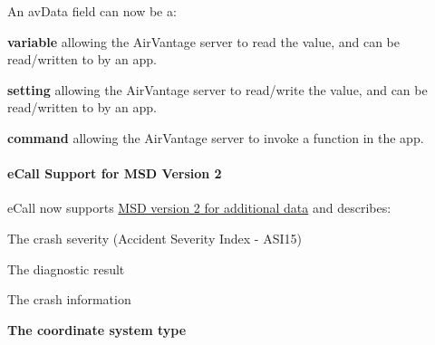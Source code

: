 An av\+Data field can now be a\+:
\begin{DoxyItemize}
\item {\bfseries variable} allowing the Air\+Vantage server to read the value, and can be read/written to by an app.
\item {\bfseries setting} allowing the Air\+Vantage server to read/write the value, and can be read/written to by an app.
\item {\bfseries command} allowing the Air\+Vantage server to invoke a function in the app.
\end{DoxyItemize}\hypertarget{releaseNotes18020_rn1802_Features_eCall}{}\paragraph{e\+Call Support for M\+S\+D Version 2}\label{releaseNotes18020_rn1802_Features_eCall}
e\+Call now supports \hyperlink{c_SDD_eCall_le_ecall_eraGlonassData}{M\+SD version 2 for additional data} and describes\+:
\begin{DoxyItemize}
\item The crash severity (Accident Severity Index -\/ A\+S\+I15)
\item The diagnostic result
\item The crash information
\item {\bfseries  The coordinate system type }
\end{DoxyItemize}

